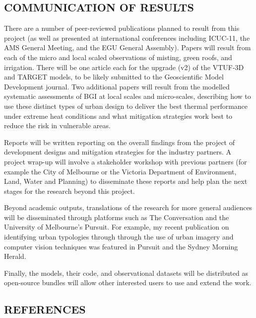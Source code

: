\subsection*{\TitleFont COMMUNICATION OF RESULTS}


There are a number of peer-reviewed publications planned to result from this project (as well as presented at international conferences including ICUC-11, the AMS General Meeting, and the EGU General Assembly). Papers will result from each of the micro and local scaled observations of misting, green roofs, and irrigation. There will be one article each for the upgrade (v2) of the VTUF-3D and TARGET models, to be likely submitted to the Geoscientific Model Development journal. Two additional papers will result from the modelled systematic assessments of BGI at local scales and micro-scales, describing how to use these distinct types of urban design to deliver the best thermal performance under extreme heat conditions and what mitigation strategies work best to reduce the risk in vulnerable areas.

Reports will be written reporting on the overall findings from the project of development designs and mitigation strategies for the industry partners. A project wrap-up will involve a stakeholder workshop with previous partners (for example the City of Melbourne or the Victoria Department of Environment, Land, Water and Planning) to disseminate these reports and help plan the next stages for the research beyond this project.

Beyond academic outputs, translations of the research for more general audiences will be disseminated through platforms such as The Conversation and the University of Melbourne's Pursuit. For example, my recent publication on identifying urban typologies through through the use of urban imagery and computer vision techniques was featured in Pursuit\cite{Nice2020c} and the Sydney Morning Herald\cite{Gladstone2018a}. 

Finally, the models, their code, and observational datasets will be distributed as open-source bundles will allow other interested users to use and extend the work.




\subsection*{\TitleFont REFERENCES}
\renewcommand{\refname}{\normalfont\selectfont\TitleFont REFERENCES} 
\begingroup
\fontsize{10pt}{10pt}\selectfont













%
